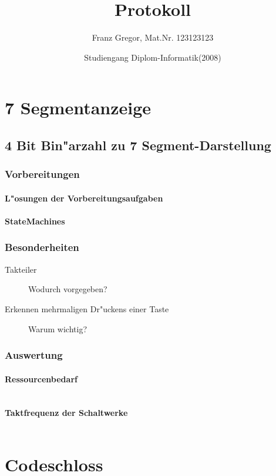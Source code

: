 \documentclass [] {scrartcl}
\begin{document}
  \subject{Praktikums Programmierbare Schaltkreise}
  \title{Protokoll}
  \author{Franz Gregor, Mat.Nr. 123123123 \and Studiengang Diplom-Informatik(2008)}

  \maketitle

  \section{7 Segmentanzeige}
  \subsection{4 Bit Bin"arzahl zu 7 Segment-Darstellung}
  \subsubsection{Vorbereitungen}
  \paragraph{L"osungen der Vorbereitungsaufgaben}
  \paragraph{StateMachines}
  \subsubsection{Besonderheiten}
  \begin{description}
    \item[Takteiler] Wodurch vorgegeben?
    \item[Erkennen mehrmaligen Dr"uckens einer Taste] Warum wichtig?
  \end{description}
  \subsubsection{Auswertung}
  \paragraph{Ressourcenbedarf}
  \begin{table}
    \begin{tabular}{}
    
    \end{tabular}
  \end{table}
  \paragraph{Taktfrequenz der Schaltwerke}
   \begin{table}
    \begin{tabular}{}
    
    \end{tabular}
  \end{table} 

  \section{Codeschloss}
\end{document}

